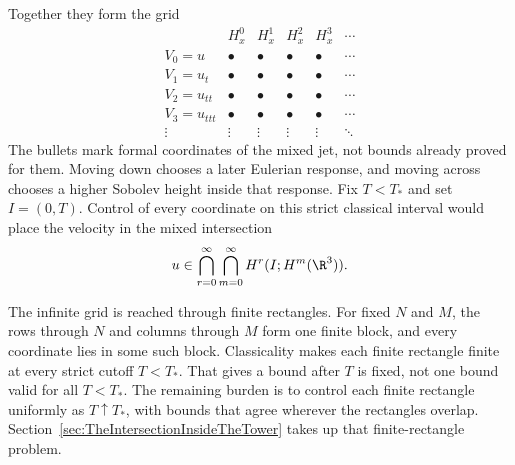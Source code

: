 Together they form the grid
{\small
\[
\begin{array}{c|ccccc}
 & H^0_x & H^1_x & H^2_x & H^3_x & \cdots\\
\hline
V_0=u      & \bullet & \bullet & \bullet & \bullet & \cdots\\
V_1=u_t    & \bullet & \bullet & \bullet & \bullet & \cdots\\
V_2=u_{tt} & \bullet & \bullet & \bullet & \bullet & \cdots\\
V_3=u_{ttt}& \bullet & \bullet & \bullet & \bullet & \cdots\\
\vdots     & \vdots  & \vdots  & \vdots  & \vdots  & \ddots
\end{array}
\]
}
The bullets mark formal coordinates of the mixed jet, not bounds already proved for them.
Moving down chooses a later Eulerian response, and moving across chooses a higher Sobolev height inside that response.
Fix \(T<T_*\) and set \(I=(0,T)\).
Control of every coordinate on this strict classical interval would place the velocity in the mixed intersection
\begin{equation}\label{eq:BodyDesiredMixedIntersection}
  u\in
  \bigcap_{r=0}^{\infty}
  \bigcap_{m=0}^{\infty}
  H^r(I;H^m(\R^3)).
\end{equation}

The infinite grid is reached through finite rectangles.
For fixed \(N\) and \(M\), the rows through \(N\) and columns through \(M\) form one finite block, and every coordinate lies in some such block.
Classicality makes each finite rectangle finite at every strict cutoff \(T<T_*\).
That gives a bound after \(T\) is fixed, not one bound valid for all \(T<T_*\).
The remaining burden is to control each finite rectangle uniformly as \(T\uparrow T_*\), with bounds that agree wherever the rectangles overlap.
Section~\ref{sec:TheIntersectionInsideTheTower} takes up that finite-rectangle problem.
